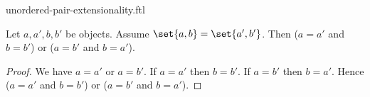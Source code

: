 \documentclass{stex}
\begin{document}
\begin{smodule}{unordered-pair-extensionality.ftl}

  \begin{forthel}
    \begin{proposition}
      Let $a, a', b, b'$ be objects.
      Assume $\set{a,b} = \set{a',b'}$.
      Then ($a = a'$ and $b = b'$) or ($a = b'$ and $b = a'$).
    \end{proposition}
    \begin{proof}
      We have $a = a'$ or $a = b'$.
      If $a = a'$ then $b = b'$.
      If $a = b'$ then $b = a'$.
      Hence ($a = a'$ and $b = b'$) or ($a = b'$ and $b = a'$).
    \end{proof}
  \end{forthel}
\end{smodule}
\end{document}
